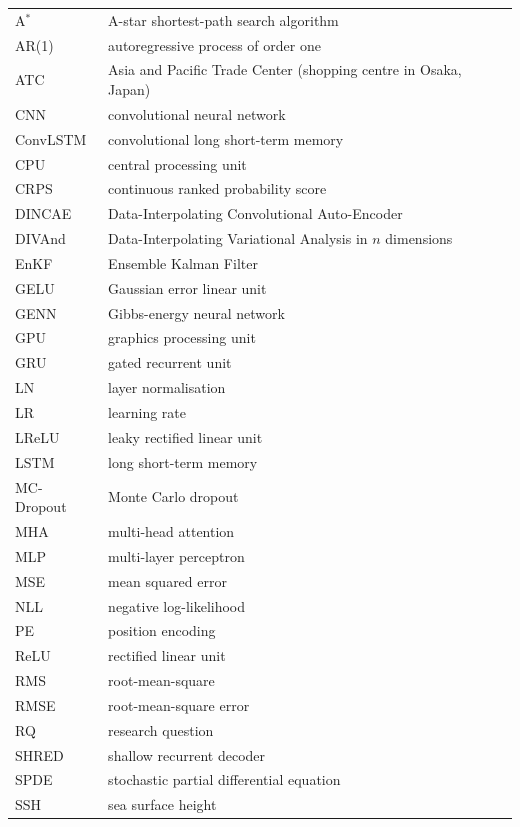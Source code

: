\documentclass[english, 12pt, a4paper, elec, utf8, a-2b, online]{aaltothesis}
\begin{document}
\begin{longtable}{p{}L{0.72\textwidth}}
A$^*$      & A-star shortest-path search algorithm \\
AR(1)      & autoregressive process of order one \\
ATC        & Asia and Pacific Trade Center (shopping centre in Osaka, Japan) \\
CNN        & convolutional neural network \\
ConvLSTM   & convolutional long short-term memory \\
CPU        & central processing unit \\
CRPS       & continuous ranked probability score \\
DINCAE     & Data-Interpolating Convolutional Auto-Encoder \\
DIVAnd     & Data-Interpolating Variational Analysis in $n$ dimensions \\
EnKF       & Ensemble Kalman Filter \\
GELU       & Gaussian error linear unit \\
GENN       & Gibbs-energy neural network \\
GPU        & graphics processing unit \\
GRU        & gated recurrent unit \\
LN         & layer normalisation \\
LR         & learning rate \\
LReLU      & leaky rectified linear unit \\
LSTM       & long short-term memory \\
MC-Dropout & Monte Carlo dropout \\
MHA        & multi-head attention \\
MLP        & multi-layer perceptron \\
MSE        & mean squared error \\
NLL        & negative log-likelihood \\
PE         & position encoding \\
ReLU       & rectified linear unit \\
RMS        & root-mean-square \\
RMSE       & root-mean-square error \\
RQ         & research question \\
SHRED      & shallow recurrent decoder \\
SPDE       & stochastic partial differential equation \\
SSH        & sea surface height \\
\end{longtable}
\setcounter{table}{0}
\end{document}
